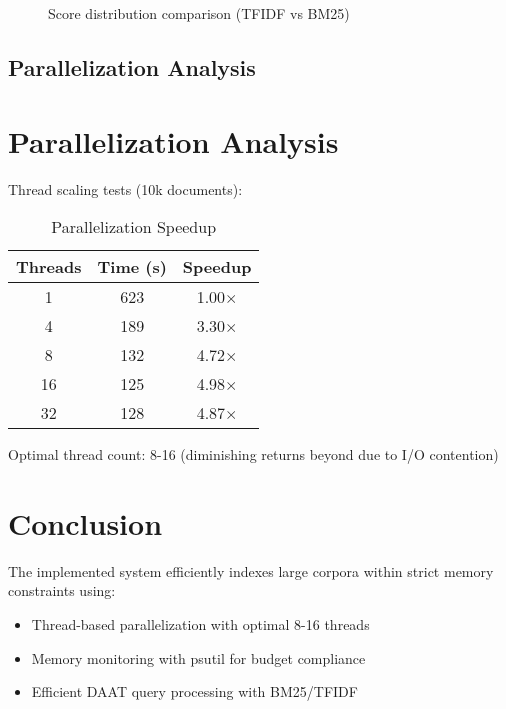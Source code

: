 \begin{figure}[htbp]
  \centering
  \caption{Score distribution comparison (TFIDF vs BM25)}
  \label{fig:scores}
\end{figure}
\subsection{Parallelization Analysis} \label{subsec:parallelization}

\section{Parallelization Analysis}
Thread scaling tests (10k documents):

\begin{table}[htbp]
  \caption{Parallelization Speedup}
  \label{tab:speedup}
  \begin{tabular}{ccc}
    \toprule
    \textbf{Threads} & \textbf{Time (s)} & \textbf{Speedup} \\
    \midrule
    1                & 623               & 1.00$\times$     \\
    4                & 189               & 3.30$\times$     \\
    8                & 132               & 4.72$\times$     \\
    16               & 125               & 4.98$\times$     \\
    32               & 128               & 4.87$\times$     \\
    \bottomrule
  \end{tabular}
\end{table}

Optimal thread count: 8-16 (diminishing returns beyond due to I/O contention)

\section{Conclusion}
The implemented system efficiently indexes large corpora within strict memory constraints using:
\begin{itemize}
  \item Thread-based parallelization with optimal 8-16 threads
  \item Memory monitoring with psutil for budget compliance
  \item Efficient DAAT query processing with BM25/TFIDF
\end{itemize}

